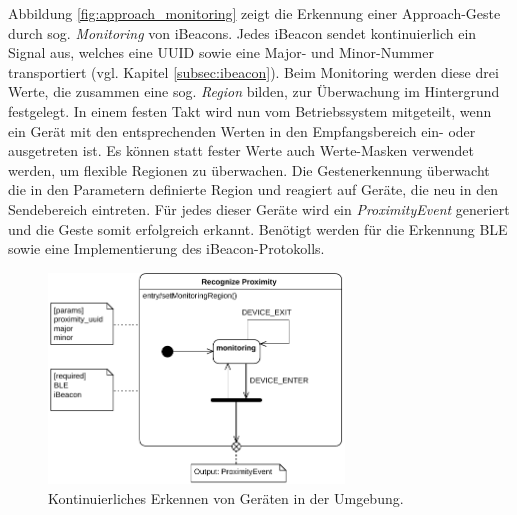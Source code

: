 Abbildung \ref{fig:approach_monitoring} zeigt die Erkennung einer Approach-Geste durch sog. \textit{Monitoring} von iBeacons. Jedes iBeacon sendet kontinuierlich ein Signal aus, welches eine \acs{UUID} sowie eine Major- und Minor-Nummer transportiert (vgl. Kapitel \ref{subsec:ibeacon}). Beim Monitoring werden diese drei Werte, die zusammen eine sog. \textit{Region} bilden, zur Überwachung im Hintergrund festgelegt. In einem festen Takt wird nun vom Betriebssystem mitgeteilt, wenn ein Gerät mit den entsprechenden Werten in den Empfangsbereich ein- oder ausgetreten ist. Es können statt fester Werte auch Werte-Masken verwendet werden, um flexible Regionen zu überwachen. Die Ges\-ten\-er\-ken\-nung überwacht die in den Parametern definierte Region und reagiert auf Geräte, die neu in den Sendebereich eintreten. Für jedes dieser Geräte wird ein \textit{ProximityEvent} generiert und die Geste somit erfolgreich erkannt. Benötigt werden für die Erkennung \acs{BLE} sowie eine Implementierung des iBeacon-Protokolls.
\begin{figure}[h]
\centering
\includegraphics[page=2,width=0.7\textwidth]{bilder/approach/recognize}
\caption{Kontinuierliches Erkennen von Geräten in der Umgebung.}
\label{fig:approach_ranging}
\end{figure}

